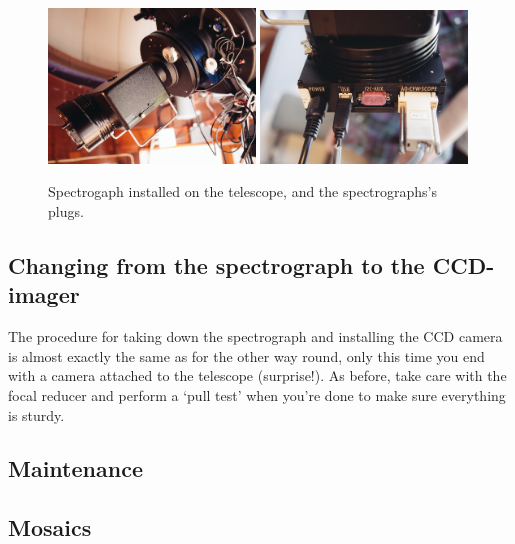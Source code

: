 \documentclass[12pt,twoside,a4paper]{report}
\begin{document}
\begin{enumerate}
  \begin{figure}[ht]
  \centering
    \includegraphics[width=0.49\textwidth]{documentation_images/change_inst5.jpg}
    \includegraphics[width=0.49\textwidth]{documentation_images/change_inst6.jpg}
    \caption{\label{fig:change_inst5} Spectrogaph installed on the telescope, and the spectrographs's plugs.}
 \end{figure}

\end{enumerate}



\subsection{Changing from the spectrograph to the CCD-imager}

The procedure for taking down the spectrograph and installing the CCD camera is almost exactly the same as for the other way round, only this time you end with a camera attached to the telescope (surprise!). As before, take care with the focal reducer and perform a `pull test' when you're done to make sure everything is sturdy.

\subsection{Maintenance}

\subsection{Mosaics}
\end{document}

